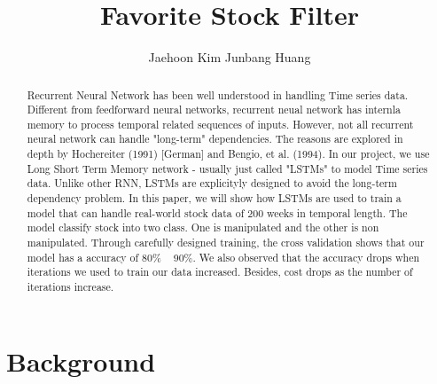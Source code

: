 \documentclass[prodmode,acmtecs]{acmsmall} %
\begin{document}
\title{Favorite Stock Filter}
\author{Jaehoon Kim
Junbang Huang
}

\begin{abstract}
Recurrent Neural Network has been well understood in handling 
Time series data. Different from feedforward neural networks, 
recurrent neual network has internla memory to process temporal
related sequences of inputs. However, not all recurrent neural network
can handle "long-term" dependencies. The reasons are explored in depth
by Hochereiter (1991) [German] and Bengio, et al. (1994). In our project, we 
use Long Short Term Memory network - usually just called "LSTMs" to model
Time series data. Unlike other RNN, LSTMs are explicityly designed to avoid the 
long-term dependency problem. In this paper, we will show how LSTMs are used 
to train a model that can handle real-world stock data of 200 weeks in temporal length. 
The model classify stock into two class. One is manipulated and the other is 
non manipulated. Through carefully designed training, the cross validation 
shows that our model has a accuracy of 80\% ~ 90\%. We also observed that 
the accuracy drops when iterations we used to train our data increased. 
Besides, cost drops as the number of iterations increase. 
\end{abstract}


%
%



\maketitle

\newpage
\section{Background}
\end{document}
